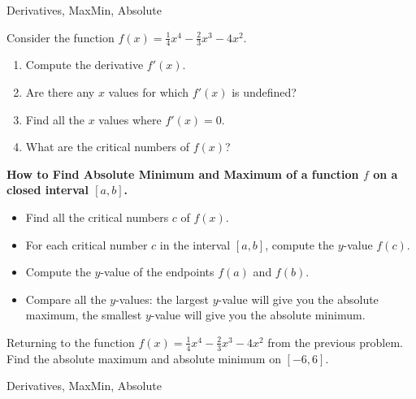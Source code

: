 

	
\begin{tagblock}{Derivatives, MaxMin, Absolute}
\begin{question}
	


Consider the function $\displaystyle f(x) = \frac{1}{4} x^4 - \frac{2}{3} x^3 - 4x^2$.
\begin{enumerate}
\item Compute the derivative $f'(x)$.
\vspace{1in}
\item Are there any $x$ values for which $f'(x)$ is undefined?
\vspace{1in}
\item Find all the $x$ values where $f'(x) = 0$.
\vspace{1in}
\item What are the critical numbers of $f(x)$?
\end{enumerate}



\newpage
\textbf{How to Find Absolute Minimum and Maximum of a function $f$ on a closed interval $[a,b]$.}
\begin{itemize}
\item Find all the critical numbers $c$ of $f(x)$.
\item For each critical number $c$ in the interval $[a,b]$, compute the $y$-value $f(c)$.
\item Compute the $y$-value of the endpoints $f(a)$ and $f(b)$.
\item Compare all the $y$-values: the largest $y$-value will give you the absolute maximum, the smallest $y$-value will give you the absolute minimum.  
\end{itemize}

\bigskip

Returning to the function $\displaystyle f(x) = \frac{1}{4} x^4 - \frac{2}{3} x^3 - 4x^2$ from the previous problem.   Find the absolute maximum and absolute minimum on $[-6,6]$. 




	
\begin{tags}
	   Derivatives, MaxMin, Absolute
\end{tags}
	
\begin{diary}
\end{diary}
	
\begin{solution}
	   
\end{solution}
	
\end{question}

\end{tagblock}

